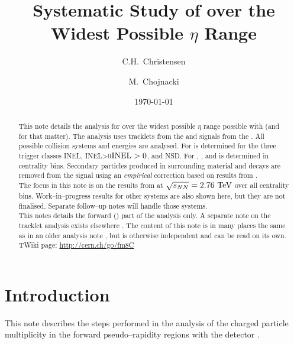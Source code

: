 \documentclass[compat,11pt]{alicenote}
\title{Systematic Study of \ndndeta{} over the Widest Possible $\eta$
  Range}
\institute{1}{Niels Bohr Institute}
\author[C.H.~Christensen \emph{et al}]{%
  C.H.~Christensen\inst[*]{} \and 
  M.~Chojnacki\inst{1}}
\date{\today}
\DeclareRobustCommand{\AlwaysText}[1]{\ifmmode\relax\text{#1}\else #1\fi}
\newcommand*\INEL{\AlwaysText{INEL}}
\newcommand*\NSD{\AlwaysText{NSD}}
\newcommand*\INELGT{\ifmmode\INEL>0\else$\INEL>0$\fi}
\let\INELGt\INELGT
\begin{document}
\maketitle{}
\renewcommand*{\thefootnote}{\arabic{footnote}}
\begin{abstract}
  \noindent
  This note details the analysis for \ndndeta{} over the widest
  possible $\eta$ range possible with \ALICE{} (and \LHC{} for that
  matter).  The analysis uses tracklets from the \SPD{} and signals
  from the \FMD{}.  All possible collision systems and energies are
  analysed.  For \ppCol{} \ndndeta{} is determined for the three
  trigger classes \INEL{}, \INELGt{}, and \NSD{}.  For \PbPbCol{},
  \pPbCol{}, and \PbpCol{} \ndndeta{} is determined in centrality
  bins. Secondary particles produced in surrounding material and
  decays are removed from the \FMD{} signal using an \emph{empirical}
  correction based on results
  from \cite{Abbas:2013bpa}. \\

  \noindent 
  The focus in this note is on the results from \PbPbCol{} at
  $\usNN{PbPb}{2760}$ over all centrality bins.  Work--in--progress
  results for other systems are also shown here, but they are not
  finalised.  Separate follow--up notes will handle those systems. \\

  \noindent
  This notes details the forward (\FMD{}) part of the analysis only.
  A separate note on the \SPD{} tracklet analysis exists elsewhere
  \cite{spdnote}.  The content of this note is in many places the same
  as in an older analysis note \cite{oldnote}, but is otherwise
  independent and can be read on its own.\\

  \noindent
  {\small TWiki page: \url{http://cern.ch/go/fm8C}}
\end{abstract}

\cleardoublepage
\tableofcontents 

\cleardoublepage

\section{Introduction}

This note describes the steps performed in the analysis of the
charged particle multiplicity in the forward pseudo--rapidity regions
with the \FMD{} detector \cite{FWD:2004mz,cholm:2009}. 
\end{document}

